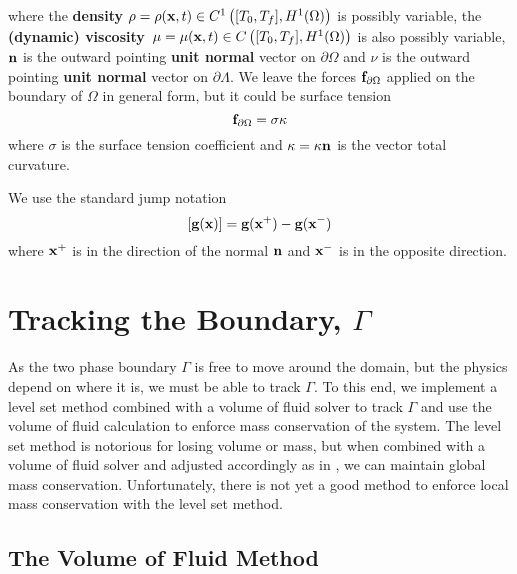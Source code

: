 \documentclass[letterpaper]{erdc}
\begin{document}
\noindent where the \textbf{density} $\rho = \rho(\textbf{x},t)\in C^{1}\left([T_0,T_f], H^{1}(\Omega)\right)$ is possibly variable, the \textbf{(dynamic) viscosity}\ $\mu = \mu(\textbf{x},t)\in C\left([T_0,T_f], H^{1}(\Omega)\right)$ is also possibly variable, $\textbf{n}$ is the outward pointing \textbf{unit normal} vector on $\partial\Omega$ and $\nu$ is the outward pointing \textbf{unit normal} vector on $\partial\Lambda$.  We leave the forces $\mathbf{f}_{\partial\Omega}$ applied on the boundary of $\Omega$ in general form, but it could be surface tension
\begin{equation}
	 \mathbf{f}_{\partial\Omega} = \sigma{\bf \kappa} 
\end{equation}
 where $\sigma$ is the surface tension coefficient and ${\bf \kappa} = \kappa\textbf{n}$ is the vector total curvature.

\noindent We use the standard jump notation
\begin{equation}  
	\left[ \textbf{g}(\textbf{x}) \right] = \textbf{g}(\textbf{x}^{+}) - \textbf{g}(\textbf{x}^{-})
\end{equation}
where $\textbf{x}^{+}$ is in the direction of the normal $\textbf{n}$ and $\textbf{x}^{-}$ is in the opposite direction.


\section{Tracking the Boundary, $\Gamma$}\label{sec:TrackingBoundaryGamma}
As the two phase boundary $\Gamma$ is free to move around the domain, but the physics depend on where it is, we must be able to track $\Gamma$.  To this end, we implement a level set method combined with a volume of fluid solver to track $\Gamma$ and use the volume of fluid calculation to enforce mass conservation of the system.  The level set method is notorious for losing volume or mass, but when combined with a volume of fluid solver and adjusted accordingly as in \cite{kees2011conservative}, we can maintain global mass conservation.  Unfortunately, there is not yet a good method to enforce local mass conservation with the level set method.

\subsection{The Volume of Fluid Method}\label{sec:VoFMEthod}
\end{document}
